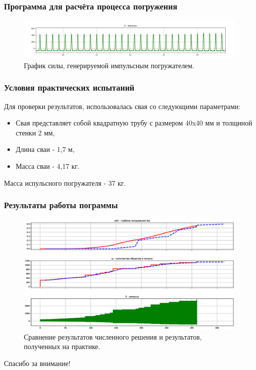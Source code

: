 \documentclass{beamer}
\begin{document}
    \begin{frame}
        \frametitle{Программа для расчёта процесса погружения}
        \begin{figure}
            \includegraphics[width=1\linewidth]{graph-impulse}
            \caption{График силы, генерируемой импульсным погружателем.}
        \end{figure}
    \end{frame}

    \begin{frame}
        \frametitle{Условия практических испытаний}
        Для проверки результатов, использовалась свая со следующими параметрами:
        \begin{itemize}
            \item Свая представляет собой квадратную трубу с размером 40x40 мм и толщиной стенки 2 мм,
            \item Длина сваи - 1,7 м,
            \item Масса сваи - 4,17 кг.
        \end{itemize}
        Масса испульсного погружателя - 37 кг.
    \end{frame}

    \begin{frame}
        \frametitle{Результаты работы пограммы}
        \begin{figure}
            \includegraphics[width=1\linewidth]{graph}
            \caption{Сравнение результатов численного решения и результатов, полученных на практике.}
        \end{figure}
    \end{frame}

    \begin{frame}
        \begin{alertblock}{}
            \centerline{\color{darkred}Спасибо за внимание!}
        \end{alertblock}
    \end{frame}
\end{document}
